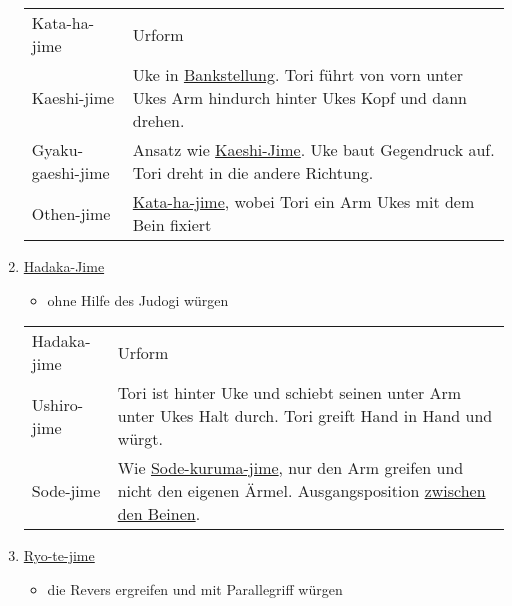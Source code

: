 \documentclass[justified, a4paper, notitlepage, captions=tableheading, nobib]{tufte-handout}
\begin{document}
\begin{enumerate}
\begin{center}
\begin{tabular}{ll}
\label{orgdb81931}Kata-ha-jime & Urform\footnotemark\\
\label{org1610b8e}Kaeshi-jime & Uke in \hyperref[orgf15b76f]{Bankstellung}. Tori führt von vorn unter Ukes Arm hindurch hinter Ukes Kopf und dann drehen.\\
\label{orge63c1dd}Gyaku-gaeshi-jime & Ansatz wie \hyperref[org1610b8e]{Kaeshi-Jime}. Uke baut Gegendruck auf. Tori dreht in die andere Richtung.\\
\label{org2e9467d}Othen-jime & \hyperref[orgdb81931]{Kata-ha-jime}, wobei Tori ein Arm Ukes mit dem Bein fixiert\\
\end{tabular}
\end{center}

\item \hyperref[org2ffc91d]{Hadaka-Jime}
\label{sec:orgf7d5150}
\begin{itemize}
\item ohne Hilfe des Judogi würgen
\end{itemize}

\begin{center}
\begin{tabular}{ll}
\label{org2ffc91d}Hadaka-jime & Urform\footnotemark\\
\label{org75f758d}Ushiro-jime & Tori ist hinter Uke und schiebt seinen unter Arm unter Ukes Halt durch. Tori greift Hand in Hand und würgt.\\
\label{orgfd3d28f}Sode-jime & Wie \hyperref[orga86277e]{Sode-kuruma-jime}, nur den Arm greifen und nicht den eigenen Ärmel. Ausgangsposition \hyperref[org891f77f]{zwischen den Beinen}.\\
\end{tabular}
\end{center}

\item \hyperref[org0f55f76]{Ryo-te-jime}
\label{sec:orgf023de9}
\begin{itemize}
\item die Revers ergreifen und mit Parallegriff würgen
\end{itemize}


\end{enumerate}
\end{document}
